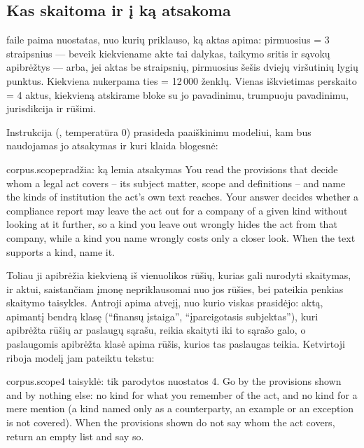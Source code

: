 \subsection{Kas skaitoma ir į ką atsakoma}

 faile  paima nuostatas, nuo kurių priklauso, ką
aktas apima: pirmuosius  = 3 straipsnius --- beveik kiekviename akte tai
dalykas, taikymo sritis ir sąvokų apibrėžtys --- arba, jei aktas be straipsnių, pirmuosius šešis
dviejų viršutinių lygių punktus. Kiekviena nukerpama ties  = 12\,000 ženklų.
Vienas iškvietimas perskaito  = 4 aktus, kiekvieną atskirame bloke su jo
pavadinimu, trumpuoju pavadinimu, jurisdikcija ir rūšimi.

Instrukcija (, temperatūra 0) prasideda paaiškinimu modeliui, kam bus
naudojamas jo atsakymas ir kuri klaida blogesnė:

\begin{promptexcerpt}{corpus.scope}{pradžia: ką lemia atsakymas}
You read the provisions that decide whom a legal act covers – its subject matter, scope and definitions – and name the kinds of institution the act's own text reaches. Your answer decides whether a compliance report may leave the act out for a company of a given kind without looking at it further, so a kind you leave out wrongly hides the act from that company, while a kind you name wrongly costs only a closer look. When the text supports a kind, name it.
\end{promptexcerpt}

Toliau ji apibrėžia kiekvieną iš vienuolikos rūšių, kurias gali nurodyti skaitymas, ir
 aktui, saistančiam įmonę nepriklausomai nuo jos rūšies, bei pateikia penkias skaitymo
taisykles. Antroji apima atvejį, nuo kurio viskas prasidėjo: aktą, apimantį bendrą klasę
(\enquote{finansų įstaiga}, \enquote{įpareigotasis subjektas}), kuri apibrėžta rūšių ar
paslaugų sąrašu, reikia skaityti iki to sąrašo galo, o paslaugomis apibrėžta klasė apima rūšis,
kurios tas paslaugas teikia. Ketvirtoji riboja modelį jam pateiktu tekstu:

\begin{promptexcerpt}{corpus.scope}{4 taisyklė: tik parodytos nuostatos}
4. Go by the provisions shown and by nothing else: no kind for what you remember of the act, and no kind for a mere mention (a kind named only as a counterparty, an example or an exception is not covered). When the provisions shown do not say whom the act covers, return an empty list and say so.
\end{promptexcerpt}


